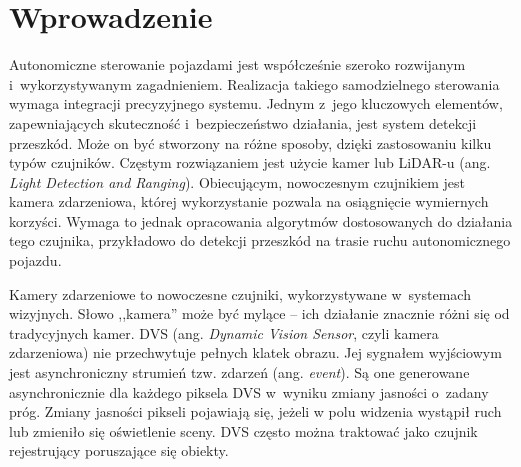 \chapter{Wprowadzenie}
\label{cha:wprowadzenie}

Autonomiczne sterowanie pojazdami jest współcześnie szeroko rozwijanym i~wykorzystywanym zagadnieniem. Realizacja takiego samodzielnego sterowania wymaga integracji precyzyjnego systemu. Jednym z~jego kluczowych elementów, zapewniających skuteczność i~bezpieczeństwo działania, jest system detekcji przeszkód. Może on być stworzony na różne sposoby, dzięki zastosowaniu kilku typów czujników. Częstym rozwiązaniem jest użycie kamer lub LiDAR-u (ang. \textit{Light Detection and Ranging}). Obiecującym, nowoczesnym czujnikiem jest kamera zdarzeniowa, której wykorzystanie pozwala na osiągnięcie wymiernych korzyści. Wymaga to jednak opracowania algorytmów dostosowanych do działania tego czujnika, przykładowo do detekcji przeszkód na trasie ruchu autonomicznego pojazdu. %

Kamery zdarzeniowe to nowoczesne czujniki, wykorzystywane w~systemach wizyjnych. Słowo ,,kamera'' może być mylące -- ich działanie znacznie różni się od tradycyjnych kamer. DVS (ang. \textit{Dynamic Vision Sensor}, czyli kamera zdarzeniowa) nie przechwytuje pełnych klatek obrazu. Jej sygnałem wyjściowym jest asynchroniczny strumień tzw. zdarzeń (ang. \textit{event}). %
Są one generowane asynchronicznie dla każdego piksela DVS w~wyniku zmiany jasności o~zadany próg. Zmiany jasności pikseli pojawiają się, jeżeli w polu widzenia wystąpił ruch lub zmieniło się oświetlenie sceny. DVS często można traktować jako czujnik rejestrujący poruszające się obiekty.




